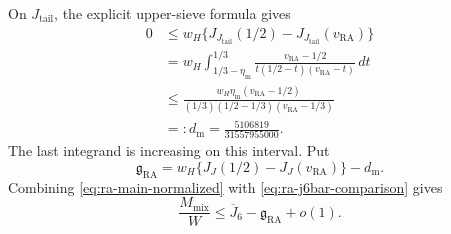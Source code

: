 On \(J_{\mathrm{tail}}\), the explicit upper-sieve formula gives
\begin{equation}\label{eq:ra-trim-debit}
\begin{aligned}
 0&\le w_H\{J_{J_{\mathrm{tail}}}(1/2)-J_{J_{\mathrm{tail}}}(v_{\mathrm{RA}})\}\\
 &=w_H\int_{1/3-\eta_{\mathrm m}}^{1/3}
       \frac{v_{\mathrm{RA}}-1/2}{t(1/2-t)(v_{\mathrm{RA}}-t)}\,dt\\
 &\le\frac{w_H\eta_{\mathrm m}(v_{\mathrm{RA}}-1/2)}
              {(1/3)(1/2-1/3)(v_{\mathrm{RA}}-1/3)}\\
 &=:d_{\mathrm m}=\frac{5106819}{31557955000}.
\end{aligned}
\end{equation}
The last integrand is increasing on this interval.
Put
\begin{equation}\label{eq:ra-exact-gain}
 \mathfrak g_{\mathrm{RA}}
   =w_H\{J_J(1/2)-J_J(v_{\mathrm{RA}})\}-d_{\mathrm m}.
\end{equation}
Combining \eqref{eq:ra-main-normalized} with \eqref{eq:ra-j6bar-comparison} gives
\begin{equation}\label{eq:ra-b11-integral}
 \frac{M_{\mathrm{mix}}}{W}
       \le\overline J_6-\mathfrak g_{\mathrm{RA}}+o(1).
\end{equation}


